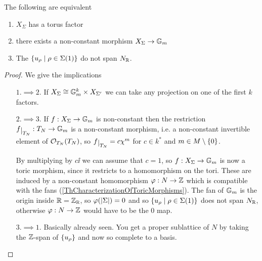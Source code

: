 \begin{proposition}[]
The following are equivalent
\begin{enumerate}
\item $X_\Sigma$ has a torus factor
\item there exists a non-constant morphism $X_\Sigma\to \mathbb{G}_m$
\item The $\left\{{u_\rho\mid \rho\in \Sigma(1)}\right\}$ do not span $N_{\mathbb{R}}$.
\end{enumerate}
\end{proposition}
\begin{proof}
We give the implications
\setlength{\leftmargini}{0cm}
\begin{itemize}
\item[$\boxed{1.\implies2.}$] If $X_\Sigma\cong \mathbb{G}_m^k\times X_{\Sigma'}$ we can take any projection on one of the first $k$ factors. 
\item[$\boxed{2.\implies3.}$] If $f:X_\Sigma\to \mathbb{G}_m$ is non-constant then the restriction $f\res{T_N}:T_N\to \G_m$ is a non-constant morphism, i.e. a non-constant invertible element of $\mathcal{O}_{T_N}(T_N)$, so $f\res{T_N}=c\chi^m$ for $c\in k^\ast$ and $m\in M\setminus\{0\}$.

By multiplying by $c\ii$ we can assume that $c=1$, so $f:X_\Sigma\to \mathbb{G}_m$ is now a toric morphism, since it restricts to a homomorphism on the tori. These are induced by a non-constant homomorphism $\varphi:N\to \mathbb{Z}$ which is compatible with the fans (\ref{ThCharacterizationOfToricMorphisms}). The fan of $\mathbb{G}_m$ is the origin inside $\mathbb{R}=\mathbb{Z}_{\mathbb{R}}$, so $\varphi(\left|{\Sigma}\right|)=0$ and so $\left\{{u_\rho\mid \rho\in \Sigma(1)}\right\}$ does not span $N_{\mathbb{R}}$, otherwise $\varphi:N\to \mathbb{Z}$ would have to be the $0$ map.
\item[$\boxed{3.\implies1.}$] Basically already seen. You get a proper sublattice of $N$ by taking the $\mathbb{Z}$-span of $\left\{{u_\rho}\right\}$ and now so complete to a basis.
\end{itemize}
\setlength{\leftmargini}{0.5cm}
\end{proof}




